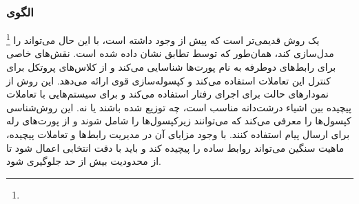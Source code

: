 \subsubsection{الگوی }
\label{archROOMSec}
\begin{RTL}
\footnote{}
یک روش قدیمی‌تر است که پیش از  وجود داشته است، با این حال
 می‌تواند  را مدل‌سازی کند، همان‌طور که توسط تطابق
 نشان داده شده است.
 نقش‌های خاصی برای رابط‌های دوطرفه به نام پورت‌ها شناسایی می‌کند
و از کلاس‌های پروتکل برای کنترل این تعاملات استفاده می‌کند و کپسوله‌سازی قوی ارائه می‌دهد.
این روش از نمودارهای حالت برای اجرای رفتار استفاده می‌کند و برای سیستم‌هایی
با تعاملات پیچیده بین اشیاء درشت‌دانه مناسب است، چه توزیع شده
باشند یا نه. این روش‌شناسی کپسول‌ها را معرفی می‌کند که می‌توانند زیرکپسول‌ها را شامل شوند
و از پورت‌های رله برای ارسال پیام استفاده کنند. با وجود مزایای آن در مدیریت
رابط‌ها و تعاملات پیچیده، ماهیت سنگین  می‌تواند روابط ساده را
پیچیده کند و باید با دقت انتخابی اعمال شود تا از محدودیت بیش از حد جلوگیری شود.
\end{RTL}